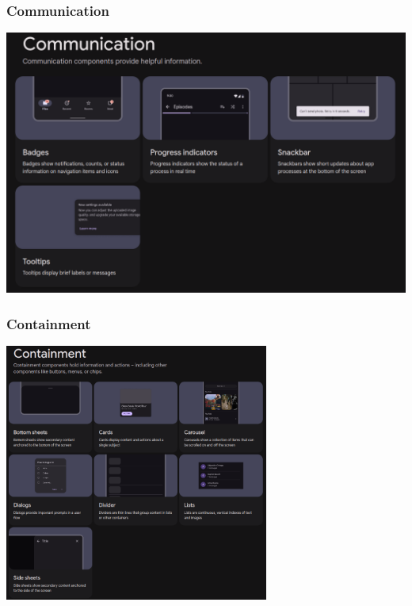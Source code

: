 \documentclass[12pt]{beamer}
\begin{document}
    \begin{frame}
        \frametitle{Communication}
    
        \includegraphics[width=1\textwidth]{communication.png}
    
    \end{frame}

    \begin{frame}
        \frametitle{Containment}
    
        \begin{center}

            \includegraphics[width=0.65\textwidth]{containment.png}

        \end{center}
    
    \end{frame}
\end{document}
